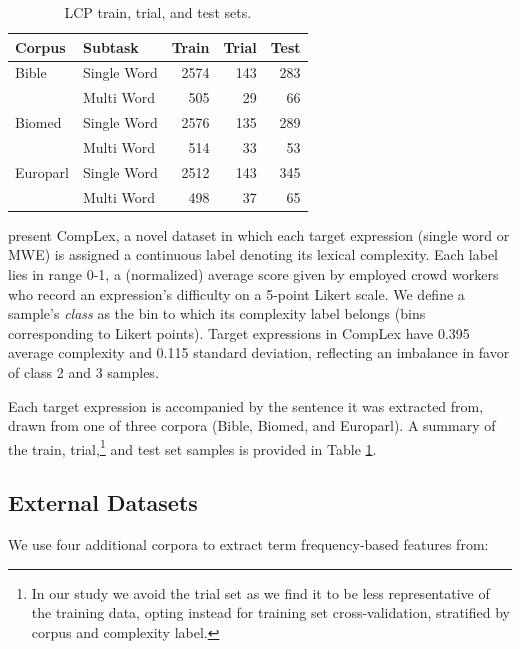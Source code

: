 \documentclass[11pt,a4paper]{article}
\begin{document}
\begin{table}
  \centering
  \begin{tabular}{l|l|r|r|r}
    \toprule
    \centering
    Corpus & Subtask & Train &  Trial &  Test \\
    \midrule
    Bible & Single Word &   2574 &    143 &   283 \\
            & Multi Word &    505 &     29 &    66 \\
    \midrule
    Biomed & Single Word &   2576 &    135 &   289 \\
            & Multi Word &    514 &     33 &    53 \\
    \midrule
    Europarl & Single Word &   2512 &    143 &   345 \\
            & Multi Word &    498 &     37 &    65 \\
    \bottomrule
  \end{tabular}
  \caption{\label{tab:datasets} LCP train, trial, and test sets.}
\end{table}

\citet{shardlow2020complex} present CompLex, a novel dataset in which each target expression (single word or MWE) is assigned a continuous label denoting its lexical complexity. Each label lies in range 0-1, a (normalized) average score given by employed crowd workers who record an expression's difficulty on a 5-point Likert scale. We define a sample's \textit{class} as the bin to which its complexity label belongs (bins corresponding to Likert points). Target expressions in CompLex have 0.395 average complexity and 0.115 standard deviation, reflecting an imbalance in favor of class 2 and 3 samples. 

Each target expression is accompanied by the sentence it was extracted from, drawn from one of three corpora (Bible, Biomed, and Europarl). A summary of the train, trial,\footnote{In our study we avoid the trial set as we find it to be less representative of the training data, opting instead for training set cross-validation, stratified by corpus and complexity label.} and test set samples is provided in Table \ref{tab:datasets}.

\subsection{External Datasets}

We use four additional corpora to extract term frequency-based features from:
\end{document}
